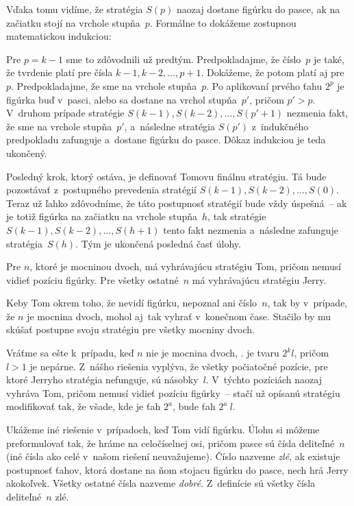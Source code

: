 {Vďaka tomu vidíme, že stratégia $S(p)$ naozaj dostane
figúrku do pasce, ak na začiatku stojí na
vrchole stupňa~$p$. Formálne to dokážeme zostupnou matematickou indukciou:

Pre $p = k-1$ sme to zdôvodnili už predtým. Predpokladajme, že
číslo~$p$ je také, že tvrdenie platí pre čísla $k-1, k-2, \ldots, p+1$.
Dokážeme, že potom platí aj pre~$p$. Predpokladajme, že sme na
vrchole stupňa~$p$. Po aplikovaní prvého ťahu $2^p$ je figúrka buď
v~pasci, alebo sa dostane na vrchol stupňa~$p'$, pričom $p'> p$. V~druhom prípade
stratégie $S(k-1), S(k-2), \ldots, S(p'+ 1)$ nezmenia fakt, že sme na
vrchole stupňa~$p'$, a~následne stratégia $S(p')$ z~indukčného predpokladu
zafunguje a~dostane figúrku do pasce. Dôkaz indukciou je teda
ukončený.

Posledný krok, ktorý ostáva, je definovať Tomovu finálnu
stratégiu. Tá bude pozostávať z~postupného prevedenia stratégií
$S(k-1), S(k-2), \ldots, S(0)$. Teraz už ľahko zdôvodníme,
že táto postupnosť stratégií bude vždy úspešná~-- ak je totiž
figúrka na začiatku na vrchole stupňa~$h$, tak stratégie
$S(k-1), S(k-2), \ldots, S(h+1)$ tento fakt nezmenia a~následne zafunguje
stratégia~$S(h)$. Tým je ukončená posledná časť úlohy.

\zaver
Pre $n$, ktoré je mocninou dvoch, má vyhrávajúcu stratégiu Tom,
pričom nemusí vidieť pozíciu figúrky. Pre všetky ostatné~$n$ má
vyhrávajúcu stratégiu Jerry.

\poznamka
Keby Tom okrem toho, že nevidí
figúrku, nepoznal ani číslo~$n$, tak by v~prípade, že $n$ je
mocnina dvoch, mohol aj~tak vyhrať v~konečnom čase. Stačilo by mu
skúšať postupne svoju stratégiu pre všetky mocniny dvoch.

\poznamka
Vráťme sa ešte k~prípadu, keď
$n$ nie je mocnina dvoch, \tj. je tvaru $2^kl$, pričom $l>1$ je
nepárne. Z~nášho riešenia vyplýva, že všetky
počiatočné pozície, pre ktoré Jerryho stratégia nefunguje, sú
násobky~$l$. V~týchto pozíciách naozaj vyhráva Tom, pričom nemusí
vidieť pozíciu figúrky~-- stačí už opísanú stratégiu
modifikovať tak, že všade, kde je ťah $2^a$, bude ťah $2^a~l$.


\ineres
Ukážeme iné riešenie
v~prípadoch, keď Tom vidí figúrku. Úlohu si môžeme preformulovať
tak, že hráme na celočíselnej osi, pričom pasce sú čísla
deliteľné~$n$ (iné čísla ako celé v~našom riešení neuvažujeme).
Číslo nazveme {\it zlé}, ak existuje postupnosť
ťahov, ktorá dostane na ňom stojacu figúrku do pasce, nech hrá Jerry akokoľvek.
Všetky ostatné čísla nazveme {\it dobré}.
Z~definície sú všetky čísla deliteľné~$n$ zlé.

}

